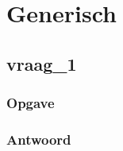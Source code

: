 \documentclass[linear_hashing.tex]{subfiles}
\begin{document}
\chapter{Generisch}
\renewcommand\thesection{V\arabic{section}}
\renewcommand\thesubsection{V\arabic{section}}

\section{vraag\_1}
\subsection*{Opgave}
\subsection*{Antwoord}
\end{document}
